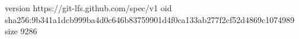 version https://git-lfs.github.com/spec/v1
oid sha256:9b341a1dcb999ba4d0c646b83759901d4f0ca133ab277f2cf52d4869c1074989
size 9286

